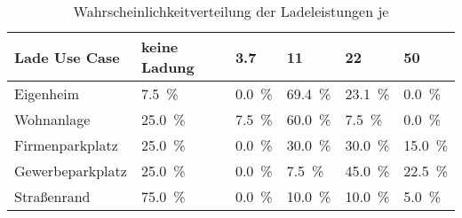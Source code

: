 {
\renewcommand{\arraystretch}{1.2}%
\begin{table}[H]
	\begin{center}
		\caption{Wahrscheinlichkeitverteilung der Ladeleistungen je \UC}
		\begin{tabu} to \textwidth {X[1.7] X[1.3, r] X[1, r] X[1, r] X[1, r] X[1, r]}
			\hline
			Lade Use   Case  & keine Ladung        & \SI{3.7}{\kw}      & \SI{11}{\kw}        & \SI{22}{\kw}        & \SI{50}{\kw}        \\ \hline
			Eigenheim        & \SI{7.5}{\percent}  & \SI{0.0}{\percent} & \SI{69.4}{\percent} & \SI{23.1}{\percent} & \SI{0.0}{\percent}  \\
			Wohnanlage       & \SI{25.0}{\percent} & \SI{7.5}{\percent} & \SI{60.0}{\percent} & \SI{7.5}{\percent}  & \SI{0.0}{\percent}  \\
			Firmenparkplatz  & \SI{25.0}{\percent} & \SI{0.0}{\percent} & \SI{30.0}{\percent} & \SI{30.0}{\percent} & \SI{15.0}{\percent} \\
			Gewerbeparkplatz & \SI{25.0}{\percent} & \SI{0.0}{\percent} & \SI{7.5}{\percent}  & \SI{45.0}{\percent} & \SI{22.5}{\percent} \\
			Straßenrand      & \SI{75.0}{\percent} & \SI{0.0}{\percent} & \SI{10.0}{\percent} & \SI{10.0}{\percent} & \SI{5.0}{\percent}  \\ \hline
		\end{tabu}
		\label{tab:UCProbability2050}
	\end{center}
	\vspace{-3mm}%
\end{table}
}